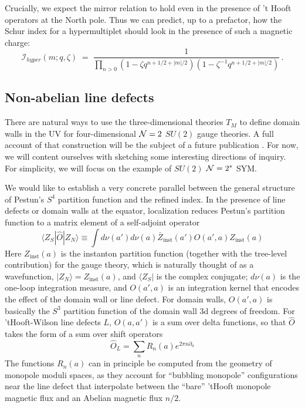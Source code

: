 \documentclass[11pt,letterpaper]{article}
\numberwithin{equation}{section}
\newcommand{\CI}{\mathcal{I}}
\begin{document}
Crucially, we expect the mirror relation to hold even in the presence of 't Hooft operators at the North pole.
Thus we can predict, up to a prefactor, how the Schur index for a hypermultiplet should look in the presence of such a
magnetic charge:
\begin{equation}
\CI_{hyper}(m; q,\zeta) \;= \; \frac{1}{\prod_{n>0} ( 1 - \zeta q^{n+1/2+|m|/2})( 1 - \zeta^{-1} q^{n+1/2+|m|/2})} \,. \label{eq:maghyper}
\end{equation}






\subsection{Non-abelian line defects}


There are natural ways to use the three-dimensional theories $T_M$ to define domain walls in the UV for four-dimensional ${\cal N}=2$ $SU(2)$ gauge theories.
A full account of that construction will be the subject of a future publication \cite{DGGV-hybrid}. For now, we will content ourselves with sketching some interesting directions of inquiry.
For simplicity, we will focus on the example of $SU(2)$ ${\cal N}=2^*$ SYM.

We would like to establish a very concrete parallel between the general structure of Pestun's $S^4$ partition function and
the refined index. In the presence of line defects or domain walls at the equator, localization reduces Pestun's partition function to a matrix element of a self-adjoint
operator \cite{DGOT,AGGTV,DGG-defects}
\begin{equation}
\langle Z_S| \hat O | Z_N \rangle \equiv \int d\nu(a') d\nu(a) \bar Z_{\mathrm{inst}}(a') O(a',a)  Z_{\mathrm{inst}}(a)
\end{equation}
Here $Z_{\mathrm{inst}}(a)$ is the instanton partition function (together with the tree-level contribution) for the gauge theory,
which is naturally thought of as a wavefunction, $| Z_N\rangle=Z_{\mathrm{inst}}(a)$, and $\langle Z_S |$ is the complex conjugate;
$d\nu(a)$ is the one-loop integration measure, and $ O(a',a)$ is an integration kernel
that encodes the effect of the domain wall or line defect. For domain walls, $O(a',a)$ is basically the $S^3$
partition function of the domain wall 3d degrees of freedom. For 'tHooft-Wilson line defects $L$,
$O(a,a')$ is a sum over delta functions, so that $\hat O$ takes the form of a sum over shift operators
\begin{equation}
\hat O_L = \sum_n R_n(a) e^{2 \pi n \partial_a}
\end{equation}
The functions $R_n(a)$ can in principle be computed from the geometry of monopole moduli spaces, as they account for
``bubbling monopole'' configurations near the line defect \cite{GOP-tHooft} that interpolate between the ``bare'' 'tHooft monopole magnetic flux
and an Abelian magnetic flux $n/2$.
\end{document}
